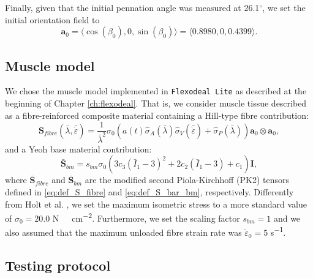\documentclass{sfuthesis}
\numberwithin{equation}{section}
\numberwithin{figure}{chapter}
\numberwithin{table}{chapter}
\theoremstyle{definition}
\def\*#1{{\mathbf{#1}}} %
\newcommand{\depsilon}{\dot{\varepsilon}}
\newcommand{\I}{{\bar{I}}}
\begin{document}
Finally, given that the initial pennation angle was measured at 26.1$^\circ$, we set the initial orientation field to
\begin{equation}
    \*a_0 = \langle \cos(\beta_0), 0, \sin(\beta_0)\rangle = \langle 0.8980, 0, 0.4399 \rangle.
\end{equation}

\subsection{Muscle model}

We chose the muscle model implemented in \texttt{Flexodeal Lite} as described at the beginning of Chapter \ref{ch:flexodeal}. That is, we consider muscle tissue described as a fibre-reinforced composite material containing a Hill-type fibre contribution:
\begin{equation}
    \*S_{fibre}(\bar{\lambda}, \bar{\depsilon}) = \dfrac{1}{\bar{\lambda}^2} \sigma_0 \left( a(t) \widehat{\sigma}_A(\bar{\lambda}) \widehat{\sigma}_V(\bar{\depsilon}) + \widehat{\sigma}_P(\bar{\lambda}) \right) \*a_0 \otimes \*a_0,
\end{equation}
and a Yeoh base material contribution:
\begin{equation}
    \bar{\*S}_{bm} = s_{bm} \sigma_{0} \left( 3c_3(\I_1-3)^2 + 2c_2 (\I_1-3) + c_1 \right) \*I,
\end{equation}
where $\bar{\*S}_{fibre}$ and $\bar{\*S}_{bm}$ are the modified second Piola-Kirchhoff (PK2) tensors defined in \eqref{eq:def_S_fibre} and \eqref{eq:def_S_bar_bm}, respectively. Differently from Holt et al. \cite{Holt2016}, we set the maximum isometric stress to a more standard value of $\sigma_0 = 20.0$ \unit{N \ cm^{-2}}. Furthermore, we set the scaling factor $s_{bm} = 1$ and we also assumed that the maximum unloaded fibre strain rate was $\depsilon_0 = 5$ \unit{s^{-1}}.

\subsection{Testing protocol}
\end{document}
